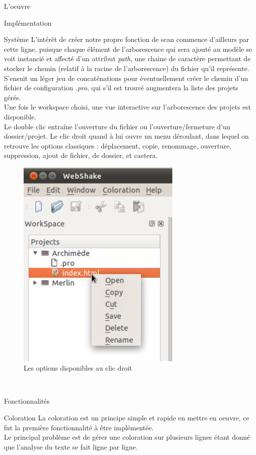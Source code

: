 \documentclass[a4paper, 12pt]{report}
\begin{document}
\begin{part}{L'oeuvre}
\begin{chapter}{Implémentation}
\begin{section}{Système}
				L'intérêt de créer notre propre fonction de scan commence d'ailleurs par cette ligne, puisque chaque élément de l'arborescence qui
				sera ajouté au modèle se voit instancié et affecté d'un attribut \emph{path}, une chaine de caractère permettant de stocker le chemin
				(relatif à la racine de l'arborescence) du fichier qu'il représente.
				S'ensuit un léger jeu de concaténations pour éventuellement créer le chemin d'un fichier de configuration \emph{.pro}, qui s'il est
				trouvé augmentera la liste des projets gérés.\\


				Une fois le workspace choisi, une vue interactive sur l'arborescence des projets est disponible.\\
				Le double clic entraîne l'ouverture du fichier ou l'ouverture/fermeture d'un dossier/projet.
				Le clic droit quand à lui ouvre un menu déroulant, dans lequel on retrouve les options classiques : déplacement, copie, renommage, ouverture, suppression, ajout de fichier, de dossier, et caetera.\\

				\begin{figure}[h]
					\begin{center}
						\includegraphics[width=8cm]{images/interactions.png}
						\caption{Les options disponibles au clic droit}
						\label{flute}
					\end{center}
				\end{figure}~\\
			\end{section}
			\begin{section}{Fonctionnalités}
				\begin{subsection}{Coloration}
					La coloration est un principe simple et rapide en mettre en oeuvre, ce fut la première fonctionnalité à être implémentée.\\
					Le principal problème est de gérer une coloration sur plusieurs lignes étant donné que l'analyse du texte se fait ligne par
					ligne.\\


\end{subsection}
\end{section}
\end{chapter}
\end{part}
\end{document}
